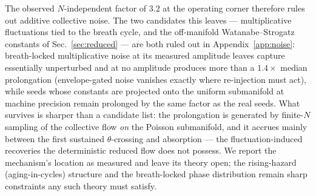 
The observed $N$-independent factor of $3.2$ at the operating corner therefore
rules out additive collective noise. The two candidates this leaves ---
multiplicative fluctuations tied to the breath cycle, and the off-manifold
Watanabe--Strogatz constants of Sec.~\ref{sec:reduced} --- are both ruled out
in Appendix~\ref{app:noise}: breath-locked multiplicative noise at its measured
amplitude leaves capture essentially unperturbed and at no amplitude produces
more than a $1.4\times$ median prolongation (envelope-gated noise vanishes
exactly where re-injection must act), while seeds whose constants are projected
onto the uniform
submanifold at machine precision remain prolonged by the same factor as the
real seeds. What survives is sharper than a candidate list: the prolongation is
generated by finite-$N$ sampling of the collective flow \emph{on} the Poisson
submanifold, and it accrues mainly between the first sustained $\theta$-crossing
and absorption --- the fluctuation-induced recoveries the deterministic reduced
flow does not possess. We report the mechanism's location as measured and leave
its theory open; the rising-hazard (aging-in-cycles) structure and the
breath-locked phase distribution remain sharp constraints any such theory must
satisfy.



